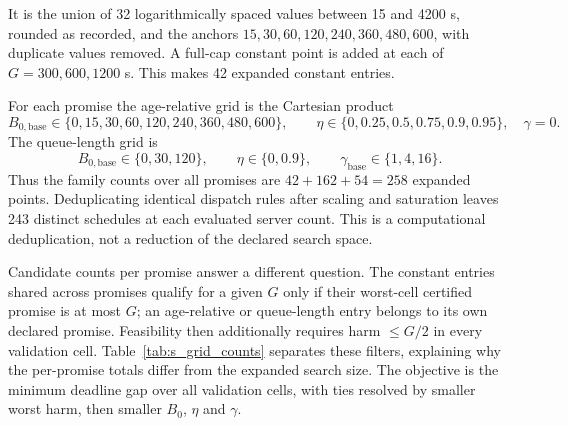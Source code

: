 \documentclass[mathematics,supfile,submit,moreauthors]{Definitions/mdpi}
\newcommand{\devnum}[1]{#1}
\begin{document}
It is the union of \devnum{32} logarithmically spaced values between
\devnum{15} and \devnum{4200} s, rounded as recorded, and the anchors
$\devnum{15},\devnum{30},\devnum{60},\devnum{120},\devnum{240},\devnum{360},
\devnum{480},\devnum{600}$, with duplicate values removed. A full-cap constant
point is added at each of $G=\devnum{300},\devnum{600},\devnum{1200}$ s.
This makes \devnum{42} expanded constant entries.

For each promise the age-relative grid is the Cartesian product
\[
 B_{0,\mathrm{base}}\in\{\devnum{0},\devnum{15},\devnum{30},\devnum{60},
 \devnum{120},\devnum{240},\devnum{360},\devnum{480},\devnum{600}\},\qquad
 \eta\in\{\devnum{0},\devnum{0.25},\devnum{0.5},\devnum{0.75},
 \devnum{0.9},\devnum{0.95}\},\quad\gamma=0.
\]
The queue-length grid is
\[
 B_{0,\mathrm{base}}\in\{\devnum{0},\devnum{30},\devnum{120}\},\qquad
 \eta\in\{\devnum{0},\devnum{0.9}\},\qquad
 \gamma_{\mathrm{base}}\in\{\devnum{1},\devnum{4},\devnum{16}\}.
\]
Thus the family counts over all promises are
$\devnum{42}+\devnum{162}+\devnum{54}=\devnum{258}$ expanded points.
Deduplicating identical dispatch rules after scaling and saturation leaves
\devnum{243} distinct schedules at each evaluated server count. This is a
computational deduplication, not a reduction of the declared search space.

Candidate counts per promise answer a different question. The constant entries
shared across promises qualify for a given $G$ only if their worst-cell certified
promise is at most $G$; an age-relative or queue-length entry belongs to its own
declared promise. Feasibility then additionally requires harm $\le G/2$ in every
validation cell. Table~\ref{tab:s_grid_counts} separates these filters, explaining
why the per-promise totals differ from the expanded search size. The objective is
the minimum deadline gap over all validation cells, with ties resolved by smaller
worst harm, then smaller $B_0$, $\eta$ and $\gamma$.
\end{document}

